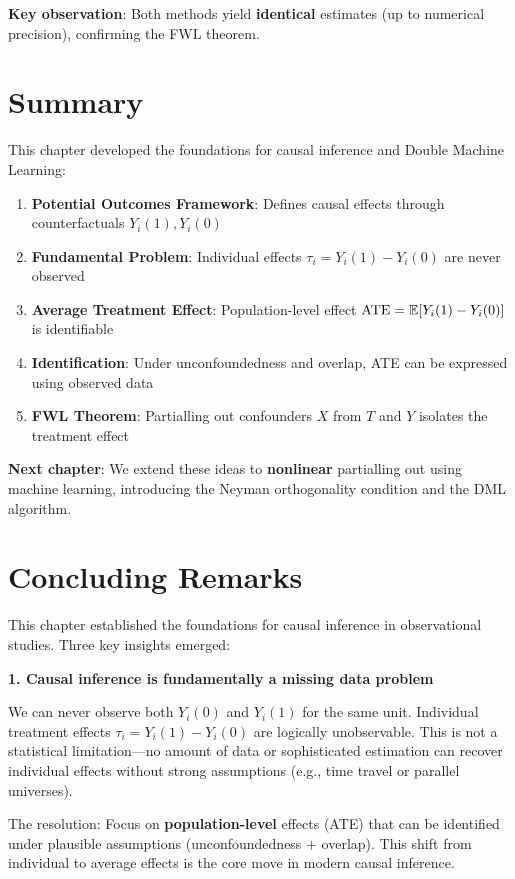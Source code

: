 \textbf{Key observation}: Both methods yield \textbf{identical}
estimates (up to numerical precision), confirming the FWL theorem.

\section{Summary}\label{sec:ch01_summary}

This chapter developed the foundations for causal inference and Double
Machine Learning:

\begin{enumerate}
\item \textbf{Potential Outcomes Framework}: Defines causal effects through
  counterfactuals $Y_i(1), Y_i(0)$
\item \textbf{Fundamental Problem}: Individual effects
  $\tau_i = Y_i(1) - Y_i(0)$ are never observed
\item \textbf{Average Treatment Effect}: Population-level effect
  $\text{ATE} = \mathbb{E}[Y_i(1) - Y_i(0)]$ is identifiable
\item \textbf{Identification}: Under unconfoundedness and overlap, ATE can
  be expressed using observed data
\item \textbf{FWL Theorem}: Partialling out confounders $X$ from $T$ and
  $Y$ isolates the treatment effect
\end{enumerate}

\textbf{Next chapter}: We extend these ideas to \textbf{nonlinear}
partialling out using machine learning, introducing the Neyman
orthogonality condition and the DML algorithm.

\section{Concluding Remarks}\label{_concluding_remarks}

This chapter established the foundations for causal inference in
observational studies. Three key insights emerged:

\textbf{1. Causal inference is fundamentally a missing data problem}

We can never observe both \(Y_i(0)\) and \(Y_i(1)\) for the same unit.
Individual treatment effects \(\tau_i = Y_i(1) - Y_i(0)\) are logically
unobservable. This is not a statistical limitation---no amount of data
or sophisticated estimation can recover individual effects without
strong assumptions (e.g., time travel or parallel universes).

The resolution: Focus on \textbf{population-level} effects (ATE) that
can be identified under plausible assumptions (unconfoundedness +
overlap). This shift from individual to average effects is the core move
in modern causal inference.

